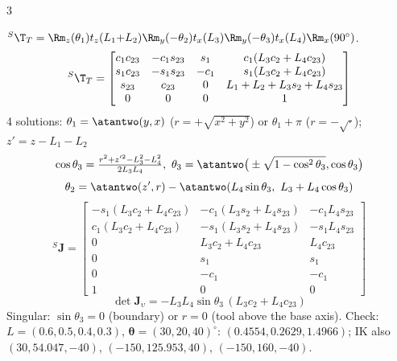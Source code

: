 \begin{multicols}{3}
\begin{fbx}
${}^S\T_T=\Rm_z(\theta_1)t_z(L_1{+}L_2)\Rm_y(-\theta_2)t_x(L_3)\Rm_y(-\theta_3)t_x(L_4)\Rm_x(90^\circ)$.
{\rbsm\[{}^S\T_T=\begin{bmatrix}c_1c_{23}&-c_1s_{23}&s_1&c_1(L_3c_2+L_4c_{23})\\s_1c_{23}&-s_1s_{23}&-c_1&s_1(L_3c_2+L_4c_{23})\\s_{23}&c_{23}&0&L_1+L_2+L_3s_2+L_4s_{23}\\0&0&0&1\end{bmatrix}\]}
4 solutions: $\theta_1=\atantwo(y,x)$ ($r=+\sqrt{x^2+y^2}$) or $\theta_1{+}\pi$ ($r=-\sqrt{\cdot}$); $z'=z-L_1-L_2$
\[\cos\theta_3=\tfrac{r^2+z'^2-L_3^2-L_4^2}{2L_3L_4},\ \theta_3=\atantwo\big(\pm\sqrt{1-\cos^2\theta_3},\cos\theta_3\big)\]
\[\theta_2=\atantwo(z',r)-\atantwo(L_4\sin\theta_3,\ L_3+L_4\cos\theta_3)\]
{\rbsm\[{}^S\mathbf J=\begin{bmatrix}-s_1(L_3c_2+L_4c_{23})&-c_1(L_3s_2+L_4s_{23})&-c_1L_4s_{23}\\c_1(L_3c_2+L_4c_{23})&-s_1(L_3s_2+L_4s_{23})&-s_1L_4s_{23}\\0&L_3c_2+L_4c_{23}&L_4c_{23}\\0&s_1&s_1\\0&-c_1&-c_1\\1&0&0\end{bmatrix}\]}
{\rbsm\[\det\mathbf J_\upsilon=-L_3L_4\sin\theta_3\,(L_3c_2+L_4c_{23})\]}
Singular: $\sin\theta_3=0$ (boundary) or $r=0$ (tool above the base axis). Check: $L=(0.6,0.5,0.4,0.3)$, $\boldsymbol\theta=(30,20,40)^\circ$: $(0.4554,0.2629,1.4966)$; IK also $(30,54.047,-40)$, $(-150,125.953,40)$, $(-150,160,-40)$. \chk
\end{fbx}


\end{multicols}
